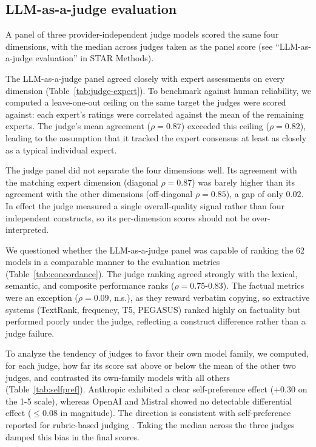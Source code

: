 \subsection{LLM-as-a-judge evaluation}

A panel of three provider-independent judge models scored the same four dimensions, with the median across judges taken as the panel score (see ``LLM-as-a-judge evaluation'' in STAR Methods).

The LLM-as-a-judge panel agreed closely with expert assessments on every dimension (Table~\ref{tab:judge-expert}). To benchmark against human reliability, we computed a leave-one-out ceiling on the same target the judges were scored against: each expert's ratings were correlated against the mean of the remaining experts. The judge's mean agreement ($\rho=0.87$) exceeded this ceiling ($\rho=0.82$), leading to the assumption that it tracked the expert consensus at least as closely as a typical individual expert.


The judge panel did not separate the four dimensions well. Its agreement with the matching expert dimension (diagonal $\rho=0.87$) was barely higher than its agreement with the other dimensions (off-diagonal $\rho=0.85$), a gap of only $0.02$. In effect the judge measured a single overall-quality signal rather than four independent constructs, so its per-dimension scores should not be over-interpreted.

We questioned whether the LLM-as-a-judge panel was capable of ranking the 62 models in a comparable manner to the evaluation metrics (Table~\ref{tab:concordance}). The judge ranking agreed strongly with the lexical, semantic, and composite performance ranks ($\rho=0.75$-$0.83$). The factual metrics were an exception ($\rho=0.09$, n.s.), as they reward verbatim copying, so extractive systems (TextRank, frequency, T5, PEGASUS) ranked highly on factuality but performed poorly under the judge, reflecting a construct difference rather than a judge failure.

To analyze the tendency of judges to favor their own model family, we computed, for each judge, how far its score sat above or below the mean of the other two judges, and contrasted its own-family models with all others (Table~\ref{tab:selfpref}). Anthropic exhibited a clear self-preference effect ($+0.30$ on the 1-5 scale), whereas OpenAI and Mistral showed no detectable differential effect ($\leq 0.08$ in magnitude). The direction is consistent with self-preference reported for rubric-based judging \citep{panicksseryLLMEvaluatorsRecognize2024,pombalSelfPreferenceBiasRubricBased2026}. Taking the median across the three judges damped this bias in the final scores.

